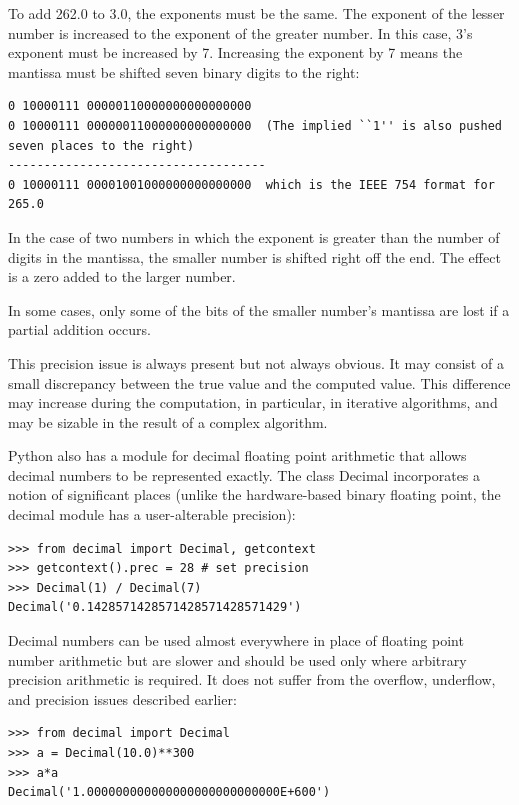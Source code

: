 \documentclass[justified,sixbynine]{tufte-book}
\theoremstyle{plain}%
\theoremstyle{definition}
\theoremstyle{remark}
\begin{document}
\begin{fullwidth}
To add 262.0 to 3.0, the exponents must be the same. The exponent of the lesser number is increased to the exponent of the greater number.  In this case, 3's exponent must be increased by 7.  Increasing the exponent by 7 means the mantissa must be shifted seven binary digits to the right:

\begin{lstlisting}
0 10000111 00000110000000000000000
0 10000111 00000011000000000000000  (The implied ``1'' is also pushed seven places to the right)
------------------------------------
0 10000111 00001001000000000000000  which is the IEEE 754 format for 265.0
\end{lstlisting}

In the case of two numbers in which the exponent is greater than the number of digits in the mantissa, the smaller number is shifted right off the end.  The effect is a zero added to the larger number.

In some cases, only some of the bits of the smaller number's mantissa are lost if a partial addition occurs.

This precision issue is always present but not always obvious. It may consist of a small discrepancy between the true value and the computed value. This difference may increase during the computation, in particular, in iterative algorithms, and may be sizable in the result of a complex algorithm.

Python also has a module for  decimal floating point arithmetic that allows decimal numbers to be represented exactly. The class Decimal incorporates a notion of significant places (unlike the hardware-based binary floating point, the decimal module has a user-alterable precision):

\begin{lstlisting}
>>> from decimal import Decimal, getcontext
>>> getcontext().prec = 28 # set precision
>>> Decimal(1) / Decimal(7)
Decimal('0.1428571428571428571428571429')
\end{lstlisting}

Decimal numbers can be used almost everywhere in place of floating point number arithmetic but are slower and should be used only where arbitrary precision arithmetic is required. It does not suffer from the overflow, underflow, and precision issues described earlier:

\begin{lstlisting}
>>> from decimal import Decimal
>>> a = Decimal(10.0)**300
>>> a*a
Decimal('1.000000000000000000000000000E+600')
\end{lstlisting}


\end{fullwidth}
\end{document}
